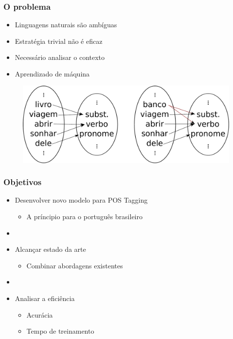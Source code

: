 \documentclass[10pt]{beamer}
\begin{document}
\begin{frame}[fragile]
  \frametitle{O problema}

  

 \begin{itemize}
      \item Linguagens naturais são ambíguas 
      \item Estratégia trivial não é eficaz
      \item Necessário analisar o contexto
      \item Aprendizado de máquina
    \end{itemize}

  
    \begin{figure}[htb]
    \begin{center}
        \includegraphics[scale=0.35]{img/funcoes.pdf}
    \end{center}
  \end{figure}

\end{frame}



\begin{frame}[fragile]
  \frametitle{Objetivos}


 \begin{itemize}
    \item Desenvolver novo modelo para POS Tagging
    \begin{itemize}
      \item[-] A príncipio para o português brasileiro
    \end{itemize}
    \item[\ ] \ 
    \item Alcançar estado da arte
    \begin{itemize}
      \item[-] Combinar abordagens existentes
    \end{itemize}
     \item[\ ] \ 
    \item Analisar a eficiência
    \begin{itemize}
      \item[-] Acurácia
      \item[-] Tempo de treinamento
    \end{itemize}
  \end{itemize}

\end{frame}
\end{document}
